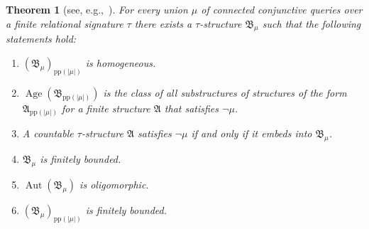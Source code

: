 \documentclass[nonacm]{acmart}
\newcommand{\bA}{{\mathfrak A}}
\newcommand{\bB}{{\mathfrak B}}
\DeclareMathOperator{\Aut}{Aut}
\DeclareMathOperator{\Age}{Age}
\newtheorem{theorem}{Theorem}[section]
\begin{document}
\begin{theorem}[{see, e.g.,~\cite[Proposition 4.3.8]{Book}}]
\label{thm:css}
For every union $\mu$ of connected conjunctive queries over a finite relational signature $\tau$ there exists a $\tau$-structure $\bB_{\mu}$ such that the following statements hold:
\begin{enumerate}
\item $(\bB_\mu)_{\text{pp}(|\mu|)}$ is homogeneous.
\item $\Age(\bB_{\text{pp}(|\mu|)})$ is the class of all substructures of structures of the form $\bA_{\text{pp}(|\mu|)}$ for a finite structure $\bA$ that satisfies $\neg \mu$.
\item A countable
$\tau$-structure $\bA$ satisfies $\neg \mu$ if and only if it embeds into $\bB_{\mu}$. 
\item $\bB_\mu$ is finitely bounded.
\item $\Aut(\bB_{\mu})$ is oligomorphic.  
\item $(\bB_\mu)_{\text{pp}(|\mu|)}$ is finitely bounded.
\end{enumerate}
\end{theorem}
\end{document}

